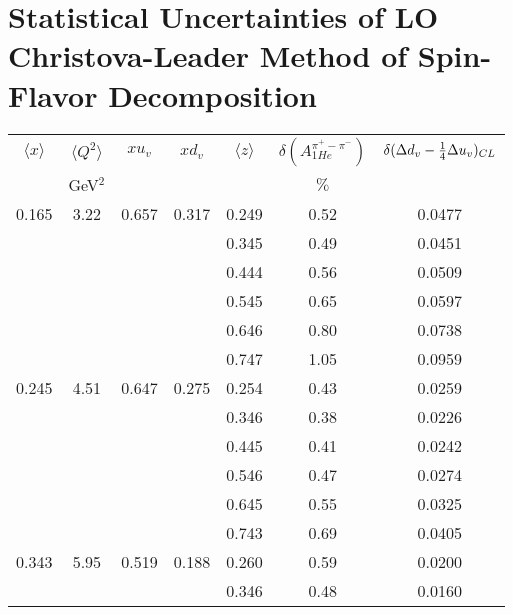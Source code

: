 \section{ Statistical Uncertainties of LO Christova-Leader Method of Spin-Flavor Decomposition}
\begin{table}[htbp]
\begin{center}
\begin{tabular}{|ccccc||c|c|}
\hline
$\langle x \rangle $   & $ \langle Q^2 \rangle $   & $x  u_v$ & $x d_v$ & $\langle z \rangle$ & $\delta \left(A_{1He}^{\pi^+ - \pi^-} \right)$  &
$\delta ( \Delta d_v -{1 \over 4} \Delta u_v )_{CL}$  \\
                       & GeV$^2$              &          &    &       &  $\%$    &                                                              \\ \hline \hline
   0.165 &    3.22 &   0.657 &    0.317 &    0.249 &      0.52 &    0.0477 \\
         &          &          &          &    0.345 &      0.49 &    0.0451 \\
         &          &          &          &    0.444 &      0.56 &    0.0509 \\
         &          &          &          &    0.545 &      0.65 &    0.0597 \\
         &          &          &          &    0.646 &      0.80 &    0.0738 \\
         &          &          &          &    0.747 &      1.05 &    0.0959 \\
   0.245 &    4.51 &   0.647 &    0.275 &    0.254 &      0.43 &    0.0259 \\
         &          &          &          &    0.346 &      0.38 &    0.0226 \\
         &          &          &          &    0.445 &      0.41 &    0.0242 \\
         &          &          &          &    0.546 &      0.47 &    0.0274 \\
         &          &          &          &    0.645 &      0.55 &    0.0325 \\
         &          &          &          &    0.743 &      0.69 &    0.0405 \\
   0.343 &    5.95 &   0.519 &    0.188 &    0.260 &      0.59 &    0.0200 \\
         &          &          &          &    0.346 &      0.48 &    0.0160 \\

\end{tabular}
\end{center}
\end{table}

